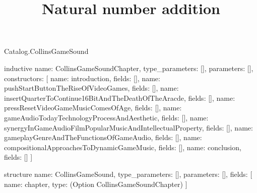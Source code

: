 \begin{lexlean}{Catalog.CollinsGameSound}
\title{Natural number addition}
\begin{semanticmodule}
inductive{
  name: CollinsGameSoundChapter,
  type_parameters: [],
  parameters: [],
  constructors: [
    {name: introduction, fields: []},
    {name: pushStartButtonTheRiseOfVideoGames, fields: []},
    {name: insertQuarterToContinue16BitAndTheDeathOfTheAracde, fields: []},
    {name: pressResetVideoGameMusicComesOfAge, fields: []},
    {name: gameAudioTodayTechnologyProcessAndAesthetic, fields: []},
    {name: synergyInGameAudioFilmPopularMusicAndIntellectualProperty, fields: []},
    {name: gameplayGenreAndTheFunctionsOfGameAudio, fields: []},
    {name: compositionalApproachesToDynamicGameMusic, fields: []},
    {name: conclusion, fields: []}
  ]
}

structure{
  name: CollinsGameSound,
  type_parameters: [],
  parameters: [],
  fields: [
    {name: chapter, type: (Option CollinsGameSoundChapter)}
  ]
}
\end{semanticmodule}
\end{lexlean}
